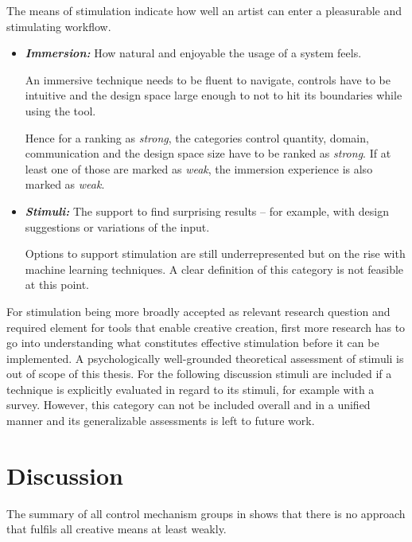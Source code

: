 The means of stimulation indicate how well an artist can enter a pleasurable and stimulating workflow.
\begin{itemize}
    \item \textit{\textbf{Immersion:}} How natural and enjoyable the usage of a system feels.

    An immersive technique needs to be fluent to navigate, controls have to be intuitive and the design space large enough to not to hit its boundaries while using the tool. 
    
    Hence for a ranking as \textit{strong}, the categories control quantity, domain, communication and the design space size have to be ranked as \textit{strong}. If at least one of those are marked as \textit{weak}, the immersion experience is also marked as \textit{weak}.

    \item \textit{\textbf{Stimuli:}} The support to find surprising results – for example, with design suggestions or variations of the input. 

    Options to support stimulation are still underrepresented but on the rise with machine learning techniques. A clear definition of this category is not feasible at this point.

\end{itemize}

For stimulation being more broadly accepted as relevant research question and required element for tools that enable creative creation, first more research has to go into understanding what constitutes effective stimulation before it can be implemented. A psychologically well-grounded theoretical assessment of stimuli is out of scope of this thesis. For the following discussion stimuli are included if a technique is explicitly evaluated in regard to its stimuli, for example with a survey. However, this category can not be included overall and in a unified manner and its generalizable assessments is left to future work.

\section{Discussion}
\label{subsec:creativity_discussion}



The summary of all control mechanism groups in  shows that there is no approach that fulfils all creative means at least weakly. 

